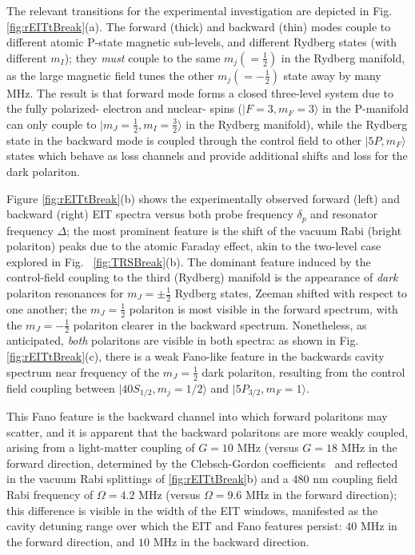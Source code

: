 \documentclass[aps,pra,twocolumn,groupedaddress,10pt,showpacs]{revtex4-1}
\begin{document}
The relevant transitions for the experimental investigation are depicted in Fig. \ref{fig:rEITtBreak}(a). The forward (thick) and backward (thin) modes couple to different atomic P-state magnetic sub-levels, and different Rydberg states (with different $m_I$); they \emph{must} couple to the same $m_j(=\frac{1}{2})$ in the Rydberg manifold, as the large magnetic field tunes the other $m_j(=-\frac{1}{2})$ state away by many MHz. The result is that forward mode forms a closed three-level system due to the fully polarized- electron and nuclear- spins ($|F=3,m_F=3\rangle$ in the P-manifold can only couple to $|m_J=\frac{1}{2},m_I=\frac{3}{2}\rangle$ in the Rydberg manifold), while the Rydberg state in the backward mode is coupled through the control field to other $|5P,m_F\rangle$ states which behave as loss channels and provide additional shifts and loss for the dark polariton.

Figure \ref{fig:rEITtBreak}(b) shows the experimentally observed forward (left) and backward (right) EIT spectra versus both probe frequency $\delta_p$ and resonator frequency $\Delta$; the most prominent feature is the shift of the vacuum Rabi (bright polariton) peaks due to the atomic Faraday effect, akin to the two-level case explored in Fig. ~\ref{fig:TRSBreak}(b). The dominant feature induced by the control-field coupling to the third (Rydberg) manifold is the appearance of \emph{dark} polariton resonances for $m_J=\pm\frac{1}{2}$ Rydberg states, Zeeman shifted with respect to one another; the $m_J=\frac{1}{2}$ polariton is most visible in the forward spectrum, with the $m_J=-\frac{1}{2}$ polariton clearer in the backward spectrum. Nonetheless, as anticipated, \emph{both} polaritons are visible in both spectra: as shown in Fig. \ref{fig:rEITtBreak}(c), there is a weak Fano-like feature in the backwards cavity spectrum near frequency of the $m_J=\frac{1}{2}$ dark polariton, resulting from the control field coupling between $|40S_{1/2},m_j=1/2\rangle$ and $|5P_{3/2},m_F=1\rangle$.

This Fano feature is the backward channel into which forward polaritons may scatter, and it is apparent that the backward polaritons are more weakly coupled, arising from a light-matter coupling of $G=10$ MHz (versus $G=18$ MHz in the forward direction, determined by the Clebsch-Gordon coefficients~\cite{steck2001rubidium} and reflected in the vacuum Rabi splittings of \ref{fig:rEITtBreak}b) and a $480$ nm coupling field Rabi frequency of $\Omega=4.2$ MHz (versus $\Omega=9.6$ MHz in the forward direction); this difference is visible in the width of the EIT windows,  manifested as the cavity detuning range over which the EIT and Fano features persist: $40$ MHz in the forward direction, and $10$ MHz in the backward direction.
\end{document}
